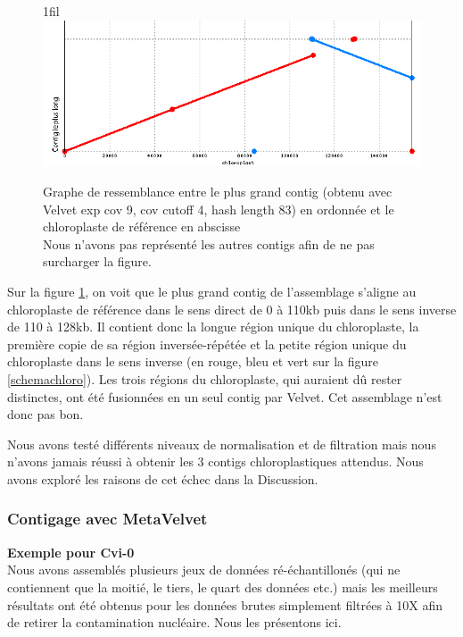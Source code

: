\documentclass[a4paper]{article}
\makeatletter
\newcommand*{\centerfloat}{%
  \parindent \z@
  \leftskip \z@ \@plus 1fil \@minus \textwidth
  \rightskip\leftskip
  \parfillskip \z@skip}
\makeatother
\begin{document}
\begin{figure}[H]
\centerfloat
\includegraphics[scale=0.7] {Assemblage/chloro_83.png}
\caption{Graphe de ressemblance entre le plus grand contig (obtenu avec Velvet exp cov 9, cov cutoff 4, hash length 83) en ordonnée et le chloroplaste de référence en abscisse\\
Nous n'avons pas représenté les autres contigs afin de ne pas surcharger la figure.}
\label{chloro_83}
\end{figure}

Sur la figure \ref{chloro_83}, on voit que le plus grand contig de l'assemblage s'aligne au chloroplaste de référence dans le sens direct de 0 à 110kb puis dans le sens inverse de 110 à 128kb. Il contient donc la longue région unique du chloroplaste, la première copie de sa région inversée-répétée et la petite région unique du chloroplaste dans le sens inverse (en rouge, bleu et vert sur la figure \ref{schemachloro}). Les trois régions du chloroplaste, qui auraient dû rester distinctes, ont été fusionnées en un seul contig par Velvet. Cet assemblage n'est donc pas bon.

Nous avons testé différents niveaux de normalisation et de filtration mais nous n'avons jamais réussi à obtenir les 3 contigs chloroplastiques attendus. Nous avons exploré les raisons de cet échec dans la Discussion.

\subsubsection{Contigage avec MetaVelvet}
\hspace{1.5cm}\textbf{\small Exemple pour Cvi-0}\\

Nous avons assemblés plusieurs jeux de données ré-échantillonés (qui ne contiennent que la moitié, le tiers, le quart des données etc.) mais les meilleurs résultats ont été obtenus pour les données brutes simplement filtrées à 10X afin de retirer la contamination nucléaire. Nous les présentons ici. 
\end{document}
